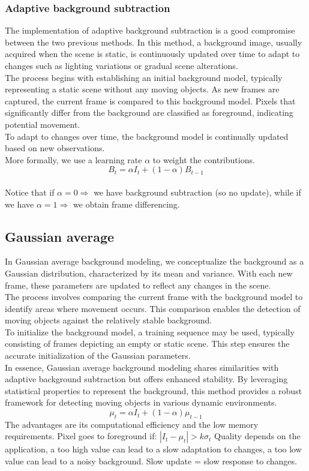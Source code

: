 \subsubsection{Adaptive background subtraction}
The implementation of adaptive background subtraction is a good compromise between the two previous methods.
In this method, a background image, usually acquired when the scene is static, is continuously updated over time to adapt to changes such as lighting variations or gradual scene alterations.
\\
The process begins with establishing an initial background model, typically representing a static scene without any moving objects. 
As new frames are captured, the current frame is compared to this background model. 
Pixels that significantly differ from the background are classified as foreground, indicating potential movement.
\\
To adapt to changes over time, the background model is continually updated based on new observations. 
\\
More formally, we use a learning rate $\alpha$ to weight the contributions.
\[ B_t=\alpha I_t + (1 -\alpha)B_{t-1}\] 
\\Notice that if $\alpha =0 \Rightarrow$ we have background subtraction (so no update), while if we have $\alpha =1 \Rightarrow$ we obtain frame differencing.
\subsection{Gaussian average}
In Gaussian average background modeling, we conceptualize the background as a Gaussian distribution, characterized by its mean and variance. 
With each new frame, these parameters are updated to reflect any changes in the scene.
\\
The process involves comparing the current frame with the background model to identify areas where movement occurs. 
This comparison enables the detection of moving objects against the relatively stable background.
\\
To initialize the background model, a training sequence may be used, typically consisting of frames depicting an empty or static scene. 
This step ensures the accurate initialization of the Gaussian parameters.
\\
In essence, Gaussian average background modeling shares similarities with adaptive background subtraction but offers enhanced stability. 
By leveraging statistical properties to represent the background, this method provides a robust framework for detecting moving objects in various dynamic environments.
\[
    \mu_{t} = \alpha I_t + (1-\alpha)\mu_{t-1}
\]
The advantages are its computational efficiency and the low memory requirements.
Pixel goes to foreground if: $|I_t - \mu_t| > k \sigma_t$
Quality depends on the application, a too high value can lead to a slow adaptation to changes, a too low value can lead to a noisy background. Slow update = slow response to changes.
